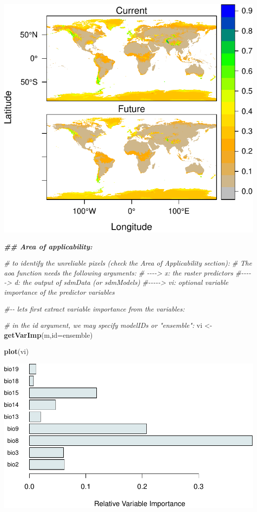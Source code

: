\documentclass[
]{article}
\newenvironment{Shaded}{\begin{snugshade}}{\end{snugshade}}
\newcommand{\AttributeTok}[1]{\textcolor[rgb]{0.13,0.29,0.53}{#1}}
\newcommand{\CommentTok}[1]{\textcolor[rgb]{0.56,0.35,0.01}{\textit{#1}}}
\newcommand{\DocumentationTok}[1]{\textcolor[rgb]{0.56,0.35,0.01}{\textbf{\textit{#1}}}}
\newcommand{\FunctionTok}[1]{\textcolor[rgb]{0.13,0.29,0.53}{\textbf{#1}}}
\newcommand{\NormalTok}[1]{#1}
\newcommand{\OtherTok}[1]{\textcolor[rgb]{0.56,0.35,0.01}{#1}}
\newcommand{\StringTok}[1]{\textcolor[rgb]{0.31,0.60,0.02}{#1}}
\begin{document}
\includegraphics{sdm_R_files/figure-latex/unnamed-chunk-11-1.pdf}

\begin{Shaded}
\begin{Highlighting}[]
\DocumentationTok{\#\# Area of applicability:}

\CommentTok{\# to identify the unreliable pixels (check the Area of Applicability section):}
\CommentTok{\# The aoa function needs the following arguments:}
\CommentTok{\# {-}{-}{-}{-}\textgreater{} x: the raster predictors}
\CommentTok{\#{-}{-}{-}{-}{-}\textgreater{} d: the output of sdmData (or sdmModels)}
\CommentTok{\#{-}{-}{-}{-}{-}\textgreater{} vi: optional variable importance of the predictor variables}

\CommentTok{\#{-}{-} let\textquotesingle{}s first extract variable importance from the variables:}

\CommentTok{\# in the id argument, we may specify modelIDs or "ensemble":}
\NormalTok{vi }\OtherTok{\textless{}{-}} \FunctionTok{getVarImp}\NormalTok{(m,}\AttributeTok{id=}\StringTok{\textquotesingle{}ensemble\textquotesingle{}}\NormalTok{)}

\FunctionTok{plot}\NormalTok{(vi)}
\end{Highlighting}
\end{Shaded}

\includegraphics{sdm_R_files/figure-latex/unnamed-chunk-11-2.pdf}
\end{document}
